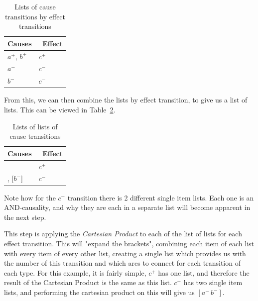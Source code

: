 \documentclass[british,conference,compsoc]{IEEEtran}
\begin{document}
\begin{table}[h]
\caption{Lists of cause transitions by effect transitions
		\label{tab:list-of-concepts}}
  \centering
\begin{tabular}[htb]{| m{2.6cm} | m{2.0cm} |}
  \hline
Causes & \, Effect \\ \hline \hline
$a^{+}$, $b^{+}$ & $c^{+}$ \\ \hline
$a^{-}$ & $c^{-}$ \\ \hline
$b^{-}$ & $c^{-}$ \\ \hline
  \end{tabular}
  \vspace{-1mm}
\end{table}

\noindent From this, we can then combine the lists by effect transition, to 
give us a list of lists. This can be viewed in Table~\ref{tab:list-of-lists}.

\vspace{-1mm}

\begin{table}[h]
\caption{Lists of lists of cause transitions
		\label{tab:list-of-lists}}

  \centering
\begin{tabular}[htb]{| m{2.6cm} | m{2.0cm} |}
  \hline
Causes & \, Effect \\ \hline \hline
[$a^{+}$, $b^{+}$] & $c^{+}$ \\ \hline
[$a^{-}$], [$b^{-}$] & $c^{-}$ \\ \hline

  \end{tabular}
 \vspace{-3mm}
\end{table}

\noindent Note how for the $c^{-}$ transition there is 2 different single item 
lists. Each one is an AND-causality, and why they are each in a separate list
will become apparent in the next step. 

This step is applying the \emph{Cartesian Product} to each of the list of lists
for each effect transition. This will "expand the brackets", combining each
item of each list with every item of every other list, creating a single list 
which provides us with the number of this transition and which arcs to connect
for each transition of each type. For this example, it is fairly simple, $c^{+}$
has one list, and therefore the result of the Cartesian Product is the same as 
this list. $c^{-}$ has two single item lists, and performing the cartesian 
product on this will give us $[a^{-}\,b^{-}]$. 
\end{document}
